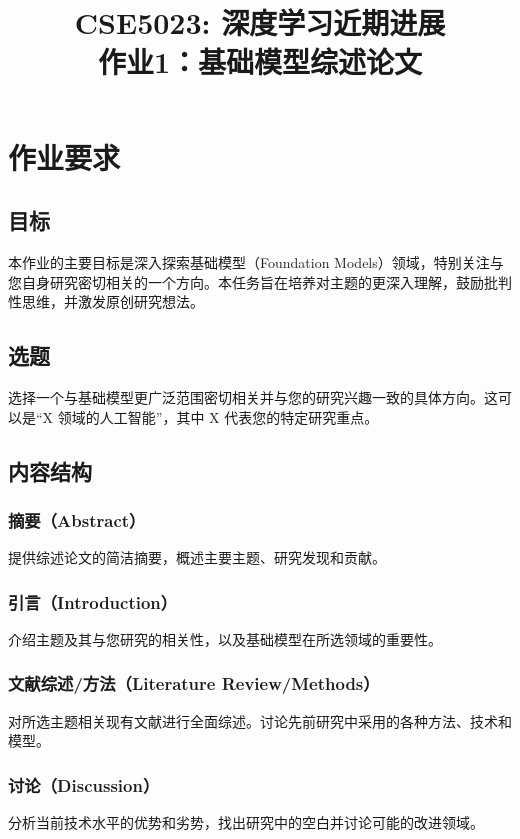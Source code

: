\documentclass[UTF8]{article}
\begin{document}
\title{CSE5023: 深度学习近期进展\\作业1：基础模型综述论文}
\author{}
\date{}

\maketitle

\section{作业要求}

\subsection{目标}

本作业的主要目标是深入探索基础模型（Foundation Models）领域，特别关注与您自身研究密切相关的一个方向。本任务旨在培养对主题的更深入理解，鼓励批判性思维，并激发原创研究想法。

\subsection{选题}

选择一个与基础模型更广泛范围密切相关并与您的研究兴趣一致的具体方向。这可以是``X 领域的人工智能''，其中 X 代表您的特定研究重点。

\subsection{内容结构}

\subsubsection{摘要（Abstract）}
提供综述论文的简洁摘要，概述主要主题、研究发现和贡献。

\subsubsection{引言（Introduction）}
介绍主题及其与您研究的相关性，以及基础模型在所选领域的重要性。

\subsubsection{文献综述/方法（Literature Review/Methods）}
对所选主题相关现有文献进行全面综述。讨论先前研究中采用的各种方法、技术和模型。

\subsubsection{讨论（Discussion）}
分析当前技术水平的优势和劣势，找出研究中的空白并讨论可能的改进领域。
\end{document}
